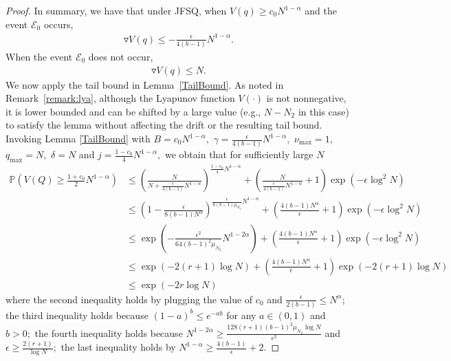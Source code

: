 \documentclass[11pt,oneside,letter]{article}
\begin{document}
\begin{proof}
In summary, we have that under JFSQ, when $V(q)\geq c_0 N^{1-\alpha}$ and the event $\mathcal E_0$ occurs,  
\begin{align*}
\triangledown V(q) \leq - \frac{\epsilon}{4(b-1)} N^{1-\alpha}.
\end{align*} When the event $\mathcal E_0$ does not occur,  
\begin{align*}
\triangledown V(q) \leq N.
\end{align*}
{We now apply the tail bound in Lemma~\ref{TailBound}. As noted in Remark~\ref{remark:lya}, although the Lyapunov function $V(\cdot)$ is not nonnegative, it is lower bounded and can be shifted by a large value (e.g., $N-N_2$ in this case) to satisfy the lemma without affecting the drift or the resulting tail bound.}
Invoking Lemma \ref{TailBound} with $B=c_0N^{1-\alpha},$ $\gamma= \frac{ \epsilon}{4(b-1)} N^{1-\alpha},$ $\nu_{\max}=1,$ $q_{\max} = N,$ $\delta = N$ and $j=\frac{1-c_0}{4}N^{1-\alpha},$ we obtain that for sufficiently large $N$
\begin{align*}
  \mathbb P\left(V(Q)\geq \frac{1+c_0}{2} N^{1-\alpha}\right)
   &\leq \left(\frac{N}{N+\frac{\epsilon}{4(b-1)} N^{1-\alpha}}\right)^{\frac{1-c_0}{4} N^{1-\alpha}}+\left(\frac{N}{\frac{\epsilon}{4(b-1)} N^{1-\alpha}}+1\right) \exp\left(-\epsilon \log^2 N\right)\\
   &\leq \left(1-\frac{\epsilon}{8(b-1)N^\alpha}\right)^{\frac{\epsilon}{8(b-1)\mu_{N_2}} N^{1-\alpha}} + \left(\frac{4(b-1)N^\alpha}{\epsilon}+1\right)\exp\left(-\epsilon\log^2 N\right)\\
   &\leq \exp\left(-\frac{\epsilon^2}{64(b-1)^2\mu_{N_2}} N^{1-2\alpha}\right) + \left(\frac{4(b-1)N^\alpha}{\epsilon}+1\right)\exp\left(-\epsilon\log^2 N\right)\\
   &\leq \exp\left(-2(r+1)\log N\right) + \left(\frac{4(b-1)N^\alpha}{\epsilon}+1\right)\exp\left(-2(r+1)\log N\right)\\
   &\leq \exp\left(-2r\log N\right)
\end{align*} 
where the second inequality holds by plugging the value of $c_0$ and $\frac{\epsilon}{2(b-1)} \leq N^{\alpha}$; the third inequality holds because $(1-a)^b\leq e^{-ab}$ for any $a\in (0,1)$ and $b>0;$ the fourth inequality holds because $N^{1-2\alpha} \geq \frac{128(r+1)(b-1)^2\mu_{N_2}\log N}{\epsilon^2}$ and $\epsilon \geq \frac{2(r+1)}{\log N};$ the last inequality holds by $N^{1-\alpha} \geq \frac{4(b-1)}{\epsilon}+2$.
\end{proof}
\end{document}
